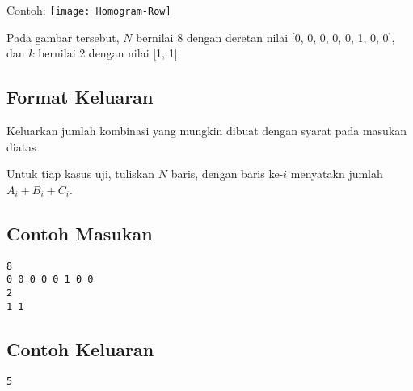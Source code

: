 \documentclass{article}
\begin{document}
Contoh:
\texttt{[image: Homogram-Row]}

Pada gambar tersebut, $N$ bernilai 8 dengan deretan nilai [0, 0, 0, 0, 0, 1, 0, 0], dan $k$ bernilai 2 dengan nilai [1, 1].

\subsection*{Format Keluaran}

Keluarkan jumlah kombinasi yang mungkin dibuat dengan syarat pada masukan diatas

Untuk tiap kasus uji, tuliskan $N$ baris, dengan baris ke-$i$ menyatakn jumlah $A_i + B_i + C_i$.
\\

\begin{multicols}{2}
\subsection*{Contoh Masukan}
\begin{lstlisting}
8
0 0 0 0 0 1 0 0
2
1 1
\end{lstlisting}
\columnbreak
\subsection*{Contoh Keluaran}
\begin{lstlisting}
5
\end{lstlisting}
\vfill
\null
\end{multicols}

\pagebreak
\end{document}
